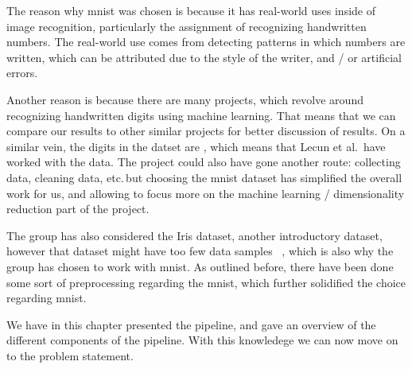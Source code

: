 The reason why \gls{mnist} was chosen is because it has real-world uses inside of image recognition, particularly the assignment of recognizing handwritten numbers. The real-world use comes from detecting patterns in which numbers are written, which can be attributed due to the style of the writer, and / or artificial errors.


Another reason is because there are many projects, which revolve around recognizing handwritten digits using machine learning. That means that we can compare our results to other similar projects for better discussion of results. On a similar vein, the digits in the datset are , which means that Lecun et al.\ have worked with the data. The project could also have gone another route: collecting data, cleaning data, etc.\,but choosing the \gls{mnist} dataset has simplified the overall work for us, and allowing to focus more on the machine learning / dimensionality reduction part of the project. 


The group has also considered the Iris dataset, another introductory dataset, however that dataset might have too few data samples ~\cite{mnist-vs-iris}, which is also why the group has chosen to work with \gls{mnist}. As outlined before, there have been done some sort of preprocessing regarding the \gls{mnist}, which further solidified the choice regarding \gls{mnist}.


We have in this chapter presented the pipeline, and gave an overview of the different components of the pipeline. With this knowledege we can now move on to the problem statement. 

